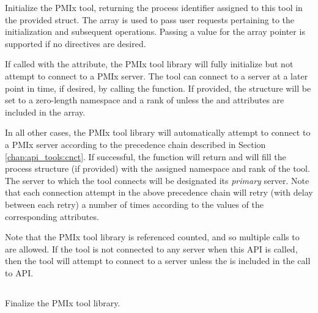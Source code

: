 \optattrend

\descr

Initialize the \ac{PMIx} tool, returning the process identifier assigned to this tool in the provided  struct. The  array is used to pass user requests pertaining to the initialization and subsequent operations. Passing a  value for the array pointer is supported if no directives are desired.

If called with the  attribute, the \ac{PMIx} tool library will fully initialize but not attempt to connect to a \ac{PMIx} server. The tool can connect to a server at a later point in time, if desired, by calling the  function. If provided, the  structure will be set to a zero-length namespace and a rank of  unless the  and  attributes are included in the  array.

In all other cases, the \ac{PMIx} tool library will automatically attempt to connect to a \ac{PMIx} server according to the precedence chain described in Section \ref{chap:api_tools:cnct}. If successful, the function will return  and will fill the process structure (if provided) with the assigned namespace and rank of the tool. The server to which the tool connects will be designated its \emph{primary} server. Note that each connection attempt in the above precedence chain will retry (with delay between each retry) a number of times according to the values of the corresponding attributes.

Note that the \ac{PMIx} tool library is referenced counted, and so multiple calls to  are allowed. If the tool is not connected to any server when this \ac{API} is called, then the tool will attempt to connect to a server unless the  is included in the call to \ac{API}.


\subsection{}

\summary

Finalize the \ac{PMIx} tool library.

\format

